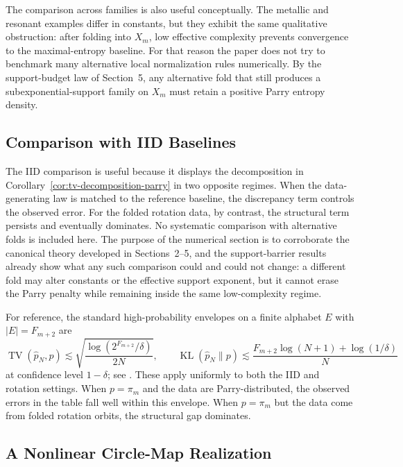 \documentclass[11pt,letterpaper]{article}
\numberwithin{equation}{section}
\theoremstyle{plain}
\theoremstyle{definition}
\theoremstyle{remark}
\DeclareMathOperator{\TV}{TV}
\DeclareMathOperator{\KL}{KL}
\begin{document}
The comparison across families is also useful conceptually. The metallic and
resonant examples differ in constants, but they exhibit the same qualitative
obstruction: after folding into \(X_m\), low effective complexity prevents
convergence to the maximal-entropy baseline. For that reason the paper does not try
to benchmark many alternative local normalization rules numerically. By the
support-budget law of Section~5, any alternative fold that still produces a
subexponential-support family on \(X_m\) must retain a positive Parry entropy
density.

\subsection{Comparison with IID Baselines}



The IID comparison is useful because it displays the decomposition in
Corollary~\ref{cor:tv-decomposition-parry} in two opposite regimes. When the
data-generating law is matched to the reference baseline, the discrepancy term
controls the observed error. For the folded rotation data, by contrast, the
structural term persists and eventually dominates.
No systematic comparison with alternative folds is included here. The purpose
of the numerical section is to corroborate the canonical theory developed in
Sections~2--5, and the support-barrier results already show what any such
comparison could and could not change: a different fold may alter constants or
the effective support exponent, but it cannot erase the Parry penalty while
remaining inside the same low-complexity regime.

For reference, the standard high-probability envelopes on a finite alphabet
\(E\) with \(|E|=F_{m+2}\) are
\[
\TV(\hat p_N,p)
\lesssim
\sqrt{\frac{\log(2^{F_{m+2}}/\delta)}{2N}},
\qquad
\KL(\hat p_N\|p)
\lesssim
\frac{F_{m+2}\log(N+1)+\log(1/\delta)}{N}
\]
at confidence level \(1-\delta\); see
\cite{WeissmanEtAl2003L1Empirical,DemboZeitouni2010LargeDeviations}. These
apply uniformly to both the IID and rotation settings. When
\(p=\pi_m\) and the data are Parry-distributed, the observed errors in the
table fall well within this envelope. When \(p=\pi_m\) but the data come from
folded rotation orbits, the structural gap dominates.

\subsection{A Nonlinear Circle-Map Realization}
\end{document}
